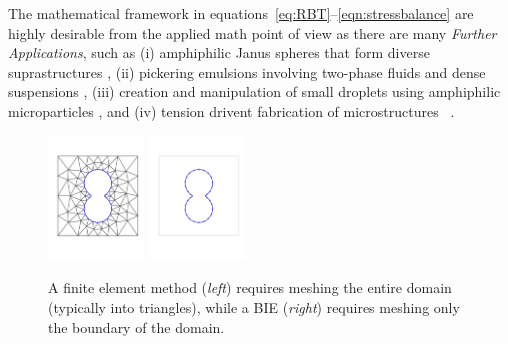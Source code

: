 The mathematical framework in equations~\eqref{eq:RBT}--\eqref{eqn:stressbalance}
are highly desirable from the applied math point of view as there are many
\emph{Further Applications}, such as
(i) amphiphilic Janus spheres that form diverse suprastructures
\cite{HaBr20,McBr21,Bradley2017},
(ii) pickering emulsions involving
two-phase fluids and dense suspensions \cite{Bradley2016},
(iii) creation and manipulation of small droplets
using amphiphilic microparticles \cite{Ha2022SurfaceEM,Ha2020MinimalSC},
and (iv) tension drivent fabrication of microstructures
~\cite{Dasgupta2017, Leong2007, Reynolds2019, Cho2010,Zeng20223DprintedMT,Russell2016EnergyLF}.
\begin{figure}
  \vspace{-5pt}
  \centering
  \includegraphics[width=1in]{figures/Background/Peanut/PeanutFEM.pdf}
  \includegraphics[width=1in]{figures/Background/Peanut/PeanutIE.pdf}
  \caption{\label{fig:fem_vs_bie} \footnotesize A finite element method
  ({\em left}) requires meshing the entire domain (typically into
  triangles), while a BIE ({\em right}) requires meshing only the
  boundary of the domain.}
\end{figure}

